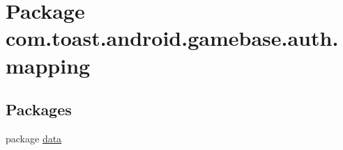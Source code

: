 \hypertarget{namespacecom_1_1toast_1_1android_1_1gamebase_1_1auth_1_1mapping}{}\section{Package com.\+toast.\+android.\+gamebase.\+auth.\+mapping}
\label{namespacecom_1_1toast_1_1android_1_1gamebase_1_1auth_1_1mapping}
\subsection*{Packages}
\begin{DoxyCompactItemize}
\item 
package \hyperlink{namespacecom_1_1toast_1_1android_1_1gamebase_1_1auth_1_1mapping_1_1data}{data}
\end{DoxyCompactItemize}
